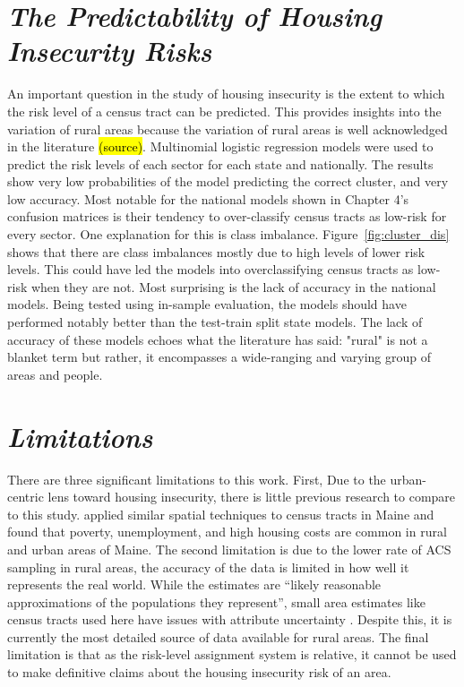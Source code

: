 \section{\textit{The Predictability of Housing Insecurity Risks}}

An important question in the study of housing insecurity is the extent to which the risk level of a census tract can be predicted. This provides insights into the variation of rural areas because the variation of rural areas is well acknowledged in the literature \hl{(source)}. Multinomial logistic regression models were used to predict the risk levels of each sector for each state and nationally. The results show very low probabilities of the model predicting the correct cluster, and very low accuracy. Most notable for the national models shown in Chapter 4's confusion matrices is their tendency to over-classify census tracts as low-risk for every sector. One explanation for this is class imbalance. Figure~\ref{fig:cluster_dis} shows that there are class imbalances mostly due to high levels of lower risk levels. This could have led the models into overclassifying census tracts as low-risk when they are not. Most surprising is the lack of accuracy in the national models. Being tested using in-sample evaluation, the models should have performed notably better than the test-train split state models. The lack of accuracy of these models echoes what the literature has said: "rural" is not a blanket term but rather, it encompasses a wide-ranging and varying group of areas and people. 


\section{\textit{Limitations}}

There are three significant limitations to this work. First, Due to the urban-centric lens toward housing insecurity, there is little previous research to compare to this study. \citet{gleason_using_2021} applied similar spatial techniques to census tracts in Maine and found that poverty, unemployment, and high housing costs are common in rural and urban areas of Maine. The second limitation is due to the lower rate of ACS sampling in rural areas, the accuracy of the data is limited in how well it represents the real world. While the estimates are “likely reasonable approximations of the populations they represent”, small area estimates like census tracts used here have issues with attribute uncertainty \citep{spielman_patterns_2014}. Despite this, it is currently the most detailed source of data available for rural areas. The final limitation is that as the risk-level assignment system is relative, it cannot be used to make definitive claims about the housing insecurity risk of an area.  

\endinput